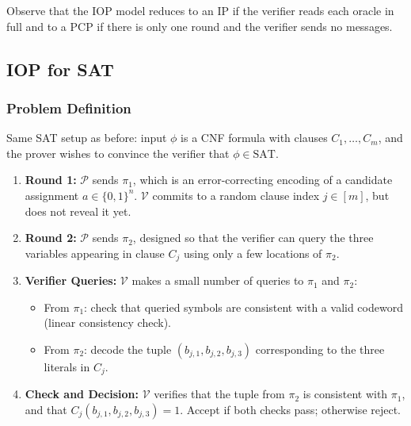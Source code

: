 Observe that the IOP model reduces to an IP if the verifier reads each oracle in full and to a PCP if there is only one round and the verifier sends no messages.

\subsection*{IOP for SAT}

\subsubsection*{Problem Definition}

Same SAT setup as before: input $\phi$ is a CNF formula with clauses $C_1,\dots,C_m$, and the prover wishes to convince the verifier that $\phi \in \text{SAT}$. 

\myspace

\begin{protocol}
\begin{enumerate}
  \item \textbf{Round 1:}  
  \(\mathcal{P}\) sends $\pi_1$, which is an error-correcting encoding of a candidate assignment $a \in \{0,1\}^n$.  
  \(\mathcal{V}\) commits to a random clause index $j \in [m]$, but does not reveal it yet.

  \item \textbf{Round 2:}  
  \(\mathcal{P}\) sends $\pi_2$, designed so that the verifier can query the three variables appearing in clause $C_j$ using only a few locations of $\pi_2$.  

  \item \textbf{Verifier Queries:}  
  \(\mathcal{V}\) makes a small number of queries to $\pi_1$ and $\pi_2$:  
  \begin{itemize}
    \item From $\pi_1$: check that queried symbols are consistent with a valid codeword (linear consistency check).  
    \item From $\pi_2$: decode the tuple $(b_{j,1},b_{j,2},b_{j,3})$ corresponding to the three literals in $C_j$.  
  \end{itemize}

  \item \textbf{Check and Decision:}  
  \(\mathcal{V}\) verifies that the tuple from $\pi_2$ is consistent with $\pi_1$, and that $C_j(b_{j,1},b_{j,2},b_{j,3})=1$.  
  Accept if both checks pass; otherwise reject.
\end{enumerate}
\end{protocol}

